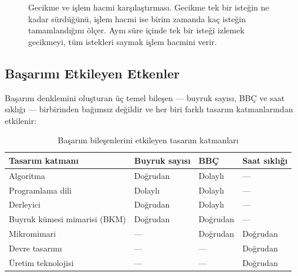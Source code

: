 \begin{figure}[H]
\caption[Gecikme ve işlem hacmi karşılaştırması]{Gecikme ve işlem hacmi karşılaştırması. Gecikme tek bir isteğin ne kadar sürdüğünü, işlem hacmi ise birim zamanda kaç isteğin tamamlandığını ölçer. Aynı süre içinde tek bir isteği izlemek gecikmeyi, tüm istekleri saymak işlem hacmini verir.}
\label{fig:gecikme-islemhacmi}
\end{figure}


\subsection{Başarımı Etkileyen Etkenler}
\label{subsec:basarim-faktorleri}

Başarım denklemini oluşturan üç temel bileşen --- buyruk sayısı, BBÇ ve saat sıklığı --- birbirinden bağımsız değildir ve her biri farklı tasarım katmanlarından etkilenir:

\begin{table}[H]
\centering
\caption{Başarım bileşenlerini etkileyen tasarım katmanları}
\label{tab:basarim-etki}
\small
\begin{tabular}{lp{3.2cm}p{3.2cm}p{3.2cm}}
\toprule
\textbf{Tasarım katmanı} & \textbf{Buyruk sayısı} & \textbf{BBÇ} & \textbf{Saat sıklığı} \\
\midrule
Algoritma      & Doğrudan   & Dolaylı    & ---         \\
Programlama dili & Dolaylı & Dolaylı    & ---         \\
Derleyici      & Doğrudan   & Dolaylı    & ---         \\
Buyruk kümesi mimarisi (BKM) & Doğrudan & Doğrudan & ---         \\
Mikromimari    & ---        & Doğrudan   & Doğrudan    \\
Devre tasarımı & ---        & ---        & Doğrudan    \\
Üretim teknolojisi & ---   & ---        & Doğrudan    \\
\bottomrule
\end{tabular}
\end{table}

